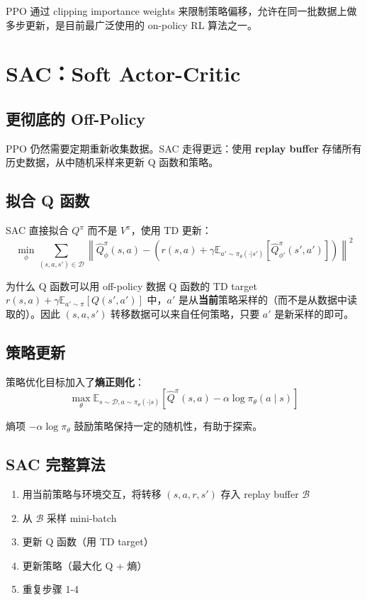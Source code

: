 \documentclass[a4paper]{article}
\begin{document}
PPO 通过 clipping importance weights 来限制策略偏移，允许在同一批数据上做多步更新，是目前最广泛使用的 on-policy RL 算法之一。

\section{SAC：Soft Actor-Critic}

\subsection{更彻底的 Off-Policy}

PPO 仍然需要定期重新收集数据。SAC 走得更远：使用 \textbf{replay buffer} 存储所有历史数据，从中随机采样来更新 Q 函数和策略。

\subsection{拟合 Q 函数}

SAC 直接拟合 $Q^\pi$ 而不是 $V^\pi$，使用 TD 更新：
$$\min_\phi \sum_{(s,a,s') \in \mathcal{D}} \left\| \hat{Q}^\pi_\phi(s, a) - \left(r(s,a) + \gamma \mathbb{E}_{a' \sim \pi_\theta(\cdot|s')}\left[\hat{Q}^\pi_{\phi'}(s', a')\right]\right)\right\|^2$$

\begin{knowledgebox}{为什么 Q 函数可以用 off-policy 数据}
Q 函数的 TD target $r(s,a) + \gamma \mathbb{E}_{a' \sim \pi}\left[Q(s', a')\right]$ 中，$a'$ 是从\textbf{当前}策略采样的（而不是从数据中读取的）。因此 $(s, a, s')$ 转移数据可以来自任何策略，只要 $a'$ 是新采样的即可。
\end{knowledgebox}

\subsection{策略更新}

策略优化目标加入了\textbf{熵正则化}：
$$\max_\theta \mathbb{E}_{s \sim \mathcal{D}, a \sim \pi_\theta(\cdot|s)} \left[\hat{Q}^\pi(s, a) - \alpha \log \pi_\theta(a \mid s)\right]$$

熵项 $-\alpha \log \pi_\theta$ 鼓励策略保持一定的随机性，有助于探索。

\subsection{SAC 完整算法}

\begin{enumerate}
    \item 用当前策略与环境交互，将转移 $(s, a, r, s')$ 存入 replay buffer $\mathcal{B}$
    \item 从 $\mathcal{B}$ 采样 mini-batch
    \item 更新 Q 函数（用 TD target）
    \item 更新策略（最大化 Q + 熵）
    \item 重复步骤 1-4
\end{enumerate}
\end{document}
